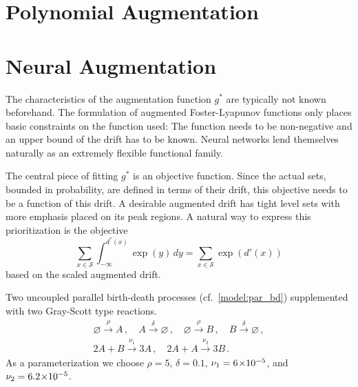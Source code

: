 \section{Polynomial Augmentation}

\section{Neural Augmentation}
The characteristics of the augmentation function $g^*$ are typically not known beforehand.
The formulation of augmented Foster-Lyapunov functions only places basic constraints on the function used:
The function needs to be non-negative and an upper bound of the drift has to be known.
Neural networks lend themselves naturally as an extremely flexible functional family.

The central piece of fitting $g^*$ is an objective function.
Since the actual sets, bounded in probability, are defined in terms of their drift, this objective needs to be a function of this drift.
A desirable augmented drift has tight level sets with more emphasis placed on its peak regions.
A natural way to express this prioritization is the objective
\[\sum_{x\in\mathcal{S}}\int_{-\infty}^{d^*(x)}\exp(y)\,dy = \sum_{x\in\mathcal{S}} \exp(d'(x)) \]
based on the scaled augmented drift.

\begin{model}\label{model:comp_spread}
	Two uncoupled parallel birth-death processes (cf.~\autoref{model:par_bd}) supplemented with two Gray-Scott type reactions.
\begin{gather*}
    \varnothing\xrightarrow{\rho} A\,, \quad
    A\xrightarrow{\delta} \varnothing\,, \quad
    \varnothing\xrightarrow{\rho} B\,, \quad
    B\xrightarrow{\delta} \varnothing\,,\\
	2A+B\xrightarrow{\nu_1}3A\,,\quad
	2A+A\xrightarrow{\nu_2}3B\,.
\end{gather*}
	As a parameterization we choose $\rho = 5$, $\delta=0.1$, $\nu_1= 6\!\times\hspace{-.5ex} 10^{-5} $, and $\nu_2= 6.2\!\times\hspace{-.5ex} 10^{-5} $.
\end{model}

